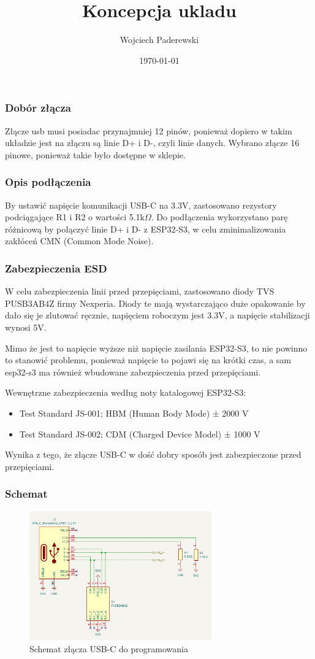 \documentclass[../../main.tex]{subfiles}
\author{Wojciech Paderewski}
\date{\today}
\title{Koncepcja ukladu}
\begin{document}
\subsubsection{Dobór złącza}
Złącze usb musi posiadac przynajmniej 12 pinów, ponieważ dopiero w takim układzie jest na złączu są linie D+ i D-, czyli linie danych.
Wybrano złącze 16 pinowe, ponieważ takie było dostępne w sklepie.
\subsubsection{Opis podłączenia}
By ustawić napięcie komunikacji USB-C na 3.3V, zastosowano rezystory podciągające R1 i R2 o wartości 5.1k$\Omega$.
Do podłączenia wykorzystano parę różnicową by połączyć linie D+ i D- z ESP32-S3, w celu zminimalizowania zakłóceń CMN (Common Mode Noise).
\subsubsection{Zabezpieczenia ESD}
W celu zabezpieczenia linii przed przepięciami, zastosowano diody TVS PUSB3AB4Z firmy Nexperia. Diody te mają wystarczająco duże opakowanie by dało się je zlutować ręcznie, napięciem roboczym jest 3.3V,
a napięcie stabilizacji wynosi 5V.

Mimo że jest to napięcie wyższe niż napięcie zasilania ESP32-S3, to nie powinno to stanowić problemu, 
ponieważ napięcie to pojawi się na krótki czas, a sam esp32-s3 ma również wbudowane zabezpieczenia przed przepięciami.

Wewnętrzne zabezpieczenia według noty katalogowej ESP32-S3:
\begin{itemize}
    \item Test Standard JS-001; HBM (Human Body Mode) ± 2000 V
    \item Test Standard JS-002; CDM (Charged Device Model) ± 1000 V
\end{itemize}
Wynika z tego, że złącze USB-C w dość dobry sposób jest zabezpieczone przed przepięciami.
\subsubsection{Schemat}
\begin{figure}[H]
    \centering
    \includegraphics[width=0.7\textwidth]{usb-c_schemat.png}
    \caption{Schemat złącza USB-C do programowania}
\end{figure}
\end{document}

